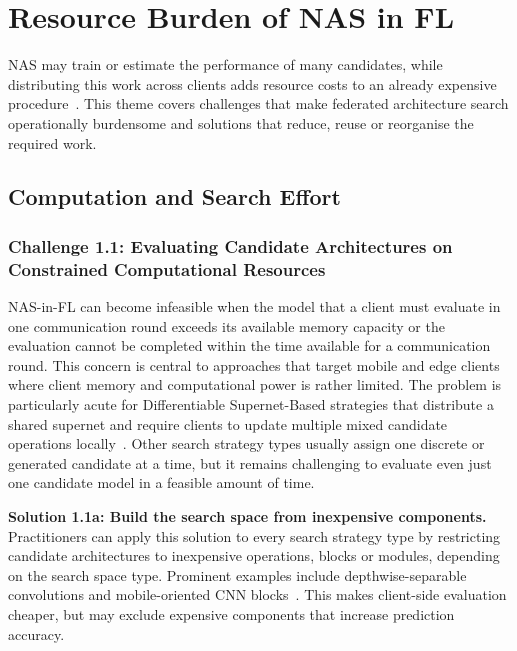 \section{Resource Burden of NAS in FL}

NAS may train or estimate the performance of many candidates, while distributing this work across clients adds resource costs to an already expensive procedure~\cite{ying2019nasbench101reproducibleneuralarchitecture,fl_advances_and_open_problems_2021}. This theme covers challenges that make federated architecture search operationally burdensome and solutions that reduce, reuse or reorganise the required work.

\subsection{Computation and Search Effort}

\subsubsection{Challenge 1.1: Evaluating Candidate Architectures on Constrained Computational Resources}

NAS-in-FL can become infeasible when the model that a client must evaluate in one communication round exceeds its available memory capacity or the evaluation cannot be completed within the time available for a communication round. This concern is central to approaches that target mobile and edge clients~\cite{fedoras_2022,fednas_over_hetero_mobile_devices_2022,dfnas_2020} where client memory and computational power is rather limited. The problem is particularly acute for Differentiable Supernet-Based strategies that distribute a shared supernet and require clients to update multiple mixed candidate operations locally~\cite{fednas_2021,dp-fnas_2020,feathers_2023,fed_auto_mri_2023}. Other search strategy types usually assign one discrete or generated candidate at a time, but it remains challenging to evaluate even just one candidate model in a feasible amount of time.

\noindent\textbf{Solution 1.1a: Build the search space from inexpensive components.} Practitioners can apply this solution to every search strategy type by restricting candidate architectures to inexpensive operations, blocks or modules, depending on the search space type. Prominent examples include depthwise-separable convolutions and mobile-oriented CNN blocks~\cite{fed_auto_mri_2023,intrusion_detection_fednas_2024}. This makes client-side evaluation cheaper, but may exclude expensive components that increase prediction accuracy.

